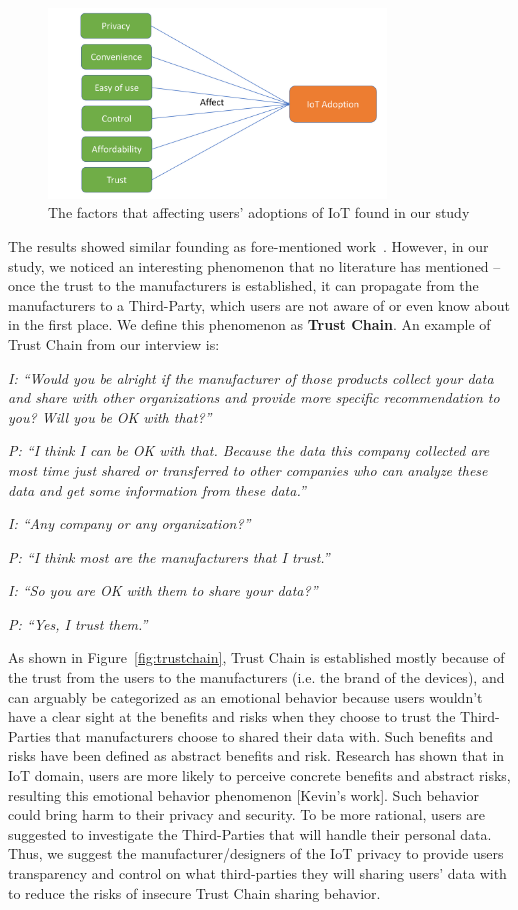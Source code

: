 \begin{figure}
	\centering
	\includegraphics[width=0.8\textwidth]{figures/pilot_study_model.pdf}
	\caption{The factors that affecting users' adoptions of IoT found in our study}
	\label{fig:pilotstudymodel}
\end{figure}

The results showed similar founding as fore-mentioned work~\cite{gao2014unified, al2016modeling}. However, in our study, we noticed an interesting phenomenon that no literature has mentioned -- once the trust to the manufacturers is established, it can propagate from the manufacturers to a Third-Party, which users are not aware of or even know about in the first place. We define this phenomenon as \textbf{Trust Chain}. An example of Trust Chain from our interview is:

\textit{I: ``Would you be alright if the manufacturer of those products collect your data and share with other organizations and provide more specific recommendation to you? Will you be OK with that?''}

\textit{P: ``I think I can be OK with that. Because the data this company collected are most time just shared or transferred to other companies who can analyze these data and get some information from these data.''}

\textit{I: ``Any company or any organization?''}

\textit{P: ``I think most are the manufacturers that I trust.''}

\textit{I: ``So you are OK with them to share your data?''}

\textit{P: ``Yes, I trust them.''}

As shown in Figure~\ref{fig:trustchain}, Trust Chain is established mostly because of the trust from the users to the manufacturers (i.e. the brand of the devices), and can arguably be categorized as an emotional behavior because users wouldn't have a clear sight at the benefits and risks when they choose to trust the Third-Parties that manufacturers choose to shared their data with. Such benefits and risks have been defined as abstract benefits and risk. Research has shown that in IoT domain, users are more likely to perceive concrete benefits and abstract risks, resulting this emotional behavior phenomenon [Kevin's work]. Such behavior could bring harm to their privacy and security. To be more rational, users are suggested to investigate the Third-Parties that will handle their personal data. Thus, we suggest the manufacturer/designers of the IoT privacy to provide users transparency and control on what third-parties they will sharing users' data with to reduce the risks of insecure Trust Chain sharing behavior.

